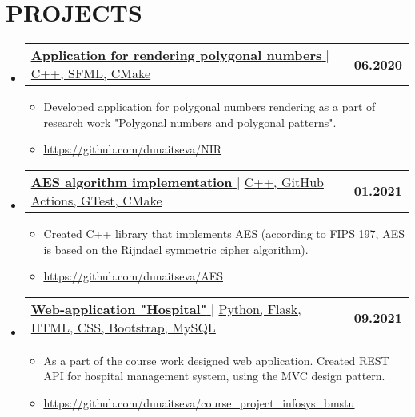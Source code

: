 \documentclass[letterpaper,11pt]{article}
\makeatletter
\newcommand{\resumeItem}[1]{
  \item\small{
    {#1 \vspace{-2pt}}
  }
}
\newcommand{\resumeProjectHeading}[2]{
    \item
    \begin{tabular*}{1.001\textwidth}{l@{\extracolsep{\fill}}r}
      \small#1 & \textbf{\small #2}\\
    \end{tabular*}\vspace{-7pt}
}
\newcommand{\resumeSubHeadingListStart}{\begin{itemize}[leftmargin=0.0in, label={}]}
\newcommand{\resumeSubHeadingListEnd}{\end{itemize}}
\newcommand{\resumeItemListStart}{\begin{itemize}}
\newcommand{\resumeItemListEnd}{\end{itemize}\vspace{-5pt}}
\makeatother
\begin{document}
\section{PROJECTS}
    \vspace{-5pt}
    \resumeSubHeadingListStart
    \resumeProjectHeading
    {\href{https://github.com/dunaitseva/NIR}{\textbf{\large{\underline{Application for rendering polygonal numbers}}} \href{Project Link}{\raisebox{-0.1\height}\faExternalLink }} $|$ \large{\underline{C++, SFML, CMake}}}{06.2020}
    \resumeItemListStart
    \resumeItem{\normalsize{Developed application for polygonal numbers rendering as a part of research work "Polygonal numbers and polygonal patterns".}}

    \resumeItem{\textcolor{accent} {\href{https://github.com/dunaitseva/NIR} {\underline{\normalsize{https://github.com/dunaitseva/NIR}}}}}
    \resumeItemListEnd 
    \vspace{-13pt}
    
    \resumeProjectHeading
    {\href{https://github.com/dunaitseva/AES}{\textbf{\large{\underline{AES algorithm implementation}}} \href{Project Link}{\raisebox{-0.1\height}\faExternalLink }} $|$ \large{\underline{C++, GitHub Actions, GTest, CMake}}}{01.2021}
    \resumeItemListStart
    \resumeItem{\normalsize{Created C++ library that implements AES (according to FIPS 197, AES is based on the Rijndael symmetric cipher algorithm).}}
    
    \resumeItem{\textcolor{accent} {\href{https://github.com/dunaitseva/AES} {\underline{\normalsize{https://github.com/dunaitseva/AES}}}}}
    \resumeItemListEnd 
    \vspace{-13pt}
    
    \resumeProjectHeading
    {\href{https://github.com/dunaitseva/course_project_infosys_bmstu}{\textbf{\large{\underline{Web-application "Hospital"}}} \href{Project Link}{\raisebox{-0.1\height}\faExternalLink }} $|$ \large{\underline{Python, Flask, HTML, CSS, Bootstrap, MySQL}}}{09.2021}
    \resumeItemListStart
    \resumeItem{\normalsize{As a part of the course work designed web application. Created REST API for hospital management system, using the MVC design pattern.}}
    
    \resumeItem{\textcolor{accent} {\href{https://github.com/dunaitseva/course_project_infosys_bmstu} {\underline{\normalsize{https://github.com/dunaitseva/course\_project\_infosys\_bmstu}}}}}
    \resumeItemListEnd 
    \resumeSubHeadingListEnd
    
\end{document}
